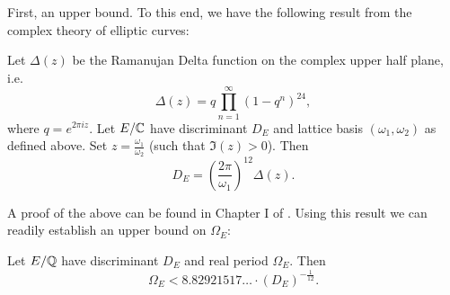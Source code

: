 First, an upper bound. To this end, we have the following result from the complex theory of elliptic curves:
\begin{proposition}
Let $\Delta(z)$ be the Ramanujan Delta function on the complex upper half plane, i.e.
\begin{equation}
\Delta(z) = q \prod_{n=1}^{\infty} (1-q^n)^{24},
\end{equation}
where $q = e^{2\pi i z}$. Let $E/\mathbb{C}$ have discriminant $D_E$ and lattice basis $(\omega_1,\omega_2)$ as defined above. Set $z = \frac{\omega_1}{\omega_2}$ (such that $\Im(z) > 0$). Then
\begin{equation}\label{eqn:modular_discriminant}
D_E = \left(\frac{2\pi}{\omega_1}\right)^{12} \Delta\left(z \right).
\end{equation}
\end{proposition}
A proof of the above can be found in Chapter I of \cite{Sil-1994}. Using this result we can readily establish an upper bound on $\Omega_E$:
\begin{proposition}\label{prop:real_period_upper_bound_discriminant}
Let $E/\mathbb{Q}$ have discriminant $D_E$ and real period $\Omega_E$. Then
\begin{equation}\label{eqn:real_period_upper_bound_discriminant}
\Omega_E < 8.82921517\ldots \cdot (D_E)^{-\frac{1}{12}}.
\end{equation}
\end{proposition}
